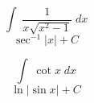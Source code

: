 \documentclass[avery5371,grid]{flashcards}
\begin{document}
\begin{flashcard}{\large \vspace*{\fill} \[ \int\; \dfrac{1}{x \sqrt{x^2-1}} \;dx \] \vspace*{\fill}   }{\large \vspace*{\fill} \[ \sec^{-1}|x| + C   \] \vspace*{\fill}   }\end{flashcard}

\begin{flashcard}{\large \vspace*{\fill} \[ \int\; \cot x \;dx \] \vspace*{\fill}   }{\large \vspace*{\fill} \[ \ln|\sin x| + C   \] \vspace*{\fill}   }\end{flashcard}
\end{document}
